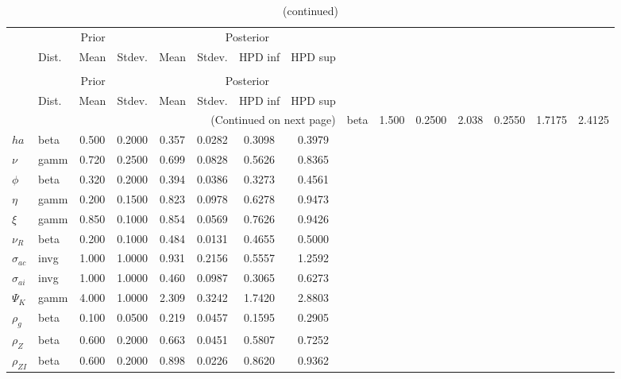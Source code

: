  
\begin{center}
\begin{longtable}{llcccccc} 
\caption{Results from Metropolis-Hastings (parameters)}
 \label{Table:MHPosterior:1}\\
\toprule 
  & \multicolumn{3}{c}{Prior}  &  \multicolumn{4}{c}{Posterior} \\
  \cmidrule(r{.75em}){2-4} \cmidrule(r{.75em}){5-8}
  & Dist. & Mean  & Stdev. & Mean & Stdev. & HPD inf & HPD sup\\
\midrule \endfirsthead 
\caption{(continued)}\\\toprule 
  & \multicolumn{3}{c}{Prior}  &  \multicolumn{4}{c}{Posterior} \\
  \cmidrule(r{.75em}){2-4} \cmidrule(r{.75em}){5-8}
  & Dist. & Mean  & Stdev. & Mean & Stdev. & HPD inf & HPD sup\\
\midrule \endhead 
\bottomrule \multicolumn{8}{r}{(Continued on next page)} \endfoot 
\bottomrule \endlastfoot 
${\sigma}$ & beta &   1.500 & 0.2500 &   2.038& 0.2550 &  1.7175 &  2.4125 \\ 
${ha}$ & beta &   0.500 & 0.2000 &   0.357& 0.0282 &  0.3098 &  0.3979 \\ 
$\nu$ & gamm &   0.720 & 0.2500 &   0.699& 0.0828 &  0.5626 &  0.8365 \\ 
${\phi}$ & beta &   0.320 & 0.2000 &   0.394& 0.0386 &  0.3273 &  0.4561 \\ 
${\eta}$ & gamm &   0.200 & 0.1500 &   0.823& 0.0978 &  0.6278 &  0.9473 \\ 
$\xi$ & gamm &   0.850 & 0.1000 &   0.854& 0.0569 &  0.7626 &  0.9426 \\ 
${\nu_R}$ & beta &   0.200 & 0.1000 &   0.484& 0.0131 &  0.4655 &  0.5000 \\ 
${\sigma_{ac}}$ & invg &   1.000 & 1.0000 &   0.931& 0.2156 &  0.5557 &  1.2592 \\ 
${\sigma_{ai}}$ & invg &   1.000 & 1.0000 &   0.460& 0.0987 &  0.3065 &  0.6273 \\ 
${\Psi_{K}}$ & gamm &   4.000 & 1.0000 &   2.309& 0.3242 &  1.7420 &  2.8803 \\ 
${\rho_g}$ & beta &   0.100 & 0.0500 &   0.219& 0.0457 &  0.1595 &  0.2905 \\ 
${\rho_Z}$ & beta &   0.600 & 0.2000 &   0.663& 0.0451 &  0.5807 &  0.7252 \\ 
${\rho_{ZI}}$ & beta &   0.600 & 0.2000 &   0.898& 0.0226 &  0.8620 &  0.9362 \\ 

\end{longtable}
\end{center}
